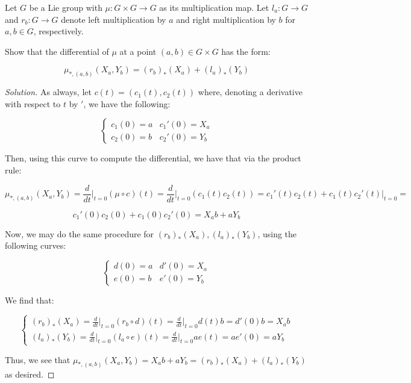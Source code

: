 \documentclass[10pt]{article}
\newenvironment{problem}[2][]{\begin{trivlist}
\item[\hskip \labelsep {\bfseries #1}\hskip \labelsep {\bfseries #2.}]}{\end{trivlist}}
\begin{document}
\begin{problem}{Question 2}

Let $G$ be a Lie group with $\mu: G \times G \to G$ as its multiplication map. Let $l_a: G \to G$ and $r_b: G \to G$ denote left multiplication by $a$ and right multiplication by $b$ for $a,b \in G$, respectively.

Show that the differential of $\mu$ at a point $(a,b) \in G \times G$ has the form:

$$ \mu_{*, (a,b)} (X_a, Y_b) = (r_b)_{*}(X_a) + (l_a)_{*}(Y_b)$$

\end{problem}

\begin{proof}[Solution]

As always, let $c(t) = (c_1(t), c_2(t))$ where, denoting a derivative with respect to $t$ by $'$, we have the following:

$$ \begin{cases} c_1(0) = a & c_1'(0) = X_a \\ c_2(0) = b & c_2'(0) = Y_b\end{cases}$$

Then, using this curve to compute the differential, we have that via the product rule:

$$ \mu_{*, (a,b)} (X_a, Y_b) = \frac{d}{dt}\bigg|_{t = 0} (\mu \circ c)(t) = \frac{d}{dt}\bigg|_{t = 0} (c_1(t) c_2(t)) = c_1'(t)c_2(t) + c_1(t) c_2'(t) \big|_{t=0} =$$

$$ c_1'(0)c_2(0) + c_1(0) c_2'(0) = X_a b + a Y_b$$

Now, we may do the same procedure for $ (r_b)_{*}(X_a), (l_a)_{*}(Y_b)$, using the following curves:

$$ \begin{cases} d(0) = a & d'(0) = X_a \\ e(0) = b & e'(0) = Y_b \end{cases}$$

We find that: 

$$\begin{cases} (r_b)_{*}(X_a) = \frac{d}{dt}\bigg|_{t = 0} (r_b \circ d)(t) =  \frac{d}{dt}\bigg|_{t = 0} d(t) b = d'(0)b = X_a b \\  (l_a)_{*}(Y_b) = \frac{d}{dt}\bigg|_{t = 0} (l_a \circ e)(t) = \frac{d}{dt}\bigg|_{t = 0} a e(t) = ae'(0) = aY_b \end{cases} $$

Thus, we see that $\mu_{*, (a,b)} (X_a, Y_b)  =  X_a b + a Y_b =  (r_b)_{*}(X_a) +  (l_a)_{*}(Y_b)$ as desired.

\end{proof}
\end{document}
